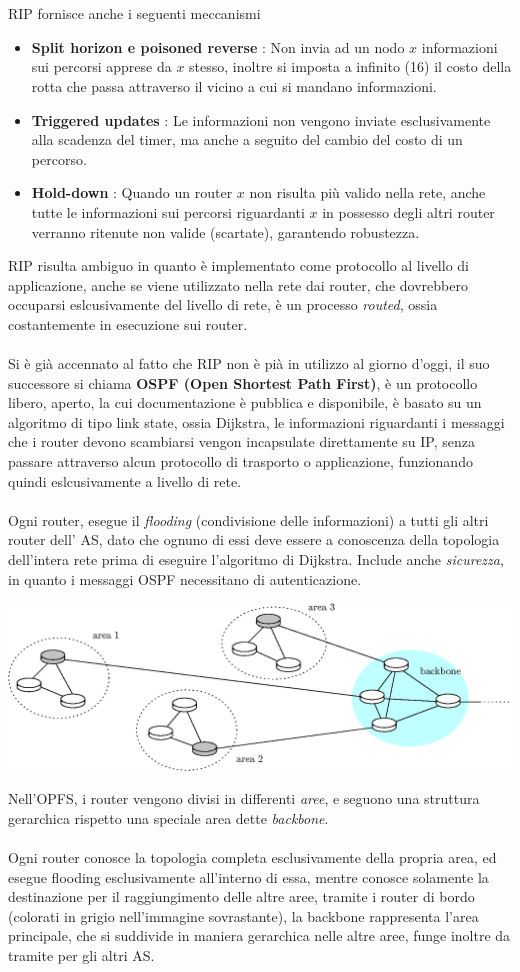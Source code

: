 \documentclass[12pt, letterpaper]{article}
\newcommand{\acc}{\\\hphantom{}\\}
\begin{document}
\acc 
RIP fornisce anche i seguenti meccanismi\begin{itemize}
    \item \textbf{Split horizon e poisoned reverse} : Non invia ad un nodo $x$ informazioni sui percorsi apprese da 
    $x$ stesso, inoltre si imposta a infinito (16) il costo della rotta che passa attraverso il vicino a cui si
    mandano informazioni.
    \item \textbf{Triggered updates} : Le informazioni non vengono inviate esclusivamente alla scadenza del timer, ma 
    anche a seguito del cambio del costo di un percorso.
    \item \textbf{Hold-down} : Quando un router $x$ non risulta più valido nella rete, anche tutte le informazioni sui percorsi 
    riguardanti $x$ in possesso degli altri router verranno ritenute non valide (scartate), garantendo robustezza.
\end{itemize}
RIP risulta ambiguo in quanto è implementato come protocollo al livello di applicazione, anche se viene utilizzato nella rete 
dai router, che dovrebbero occuparsi eslcusivamente del livello di rete, è un processo \textit{routed}, ossia costantemente in 
esecuzione sui router.\acc 
Si è già accennato al fatto che RIP non è pià in utilizzo al giorno d'oggi, il suo successore si chiama
 \textbf{OSPF (Open Shortest Path First)}, è un protocollo libero, aperto, la cui documentazione è pubblica e disponibile, 
 è basato su un algoritmo di tipo link state, ossia Dijkstra, le informazioni riguardanti i messaggi che i router devono 
 scambiarsi vengon incapsulate direttamente su IP, senza passare attraverso alcun protocollo di trasporto o applicazione,
 funzionando quindi eslcusivamente a livello di rete.\acc 
 Ogni router, esegue il \textit{flooding} (condivisione delle informazioni) a tutti gli altri router dell' AS, dato che ognuno di 
 essi deve essere a conoscenza della topologia dell'intera rete prima di eseguire l'algoritmo di Dijkstra. Include anche 
 \textit{sicurezza}, in quanto i messaggi OSPF necessitano di autenticazione.\begin{center}
    \includegraphics[width=\textwidth ]{images/OPFS.eps}
\end{center}
Nell'OPFS, i router vengono divisi in differenti \textit{aree}, e seguono una struttura gerarchica rispetto una 
speciale area dette \textit{backbone}.\acc  Ogni router conosce la topologia completa esclusivamente della propria area, 
ed esegue flooding esclusivamente all'interno di essa, mentre 
conosce solamente la destinazione per il raggiungimento delle altre aree, tramite i router di bordo (colorati in grigio
nell'immagine sovrastante), la backbone rappresenta l'area principale, che si suddivide 
in maniera gerarchica nelle altre aree, funge inoltre da tramite per gli altri AS.
\end{document}
